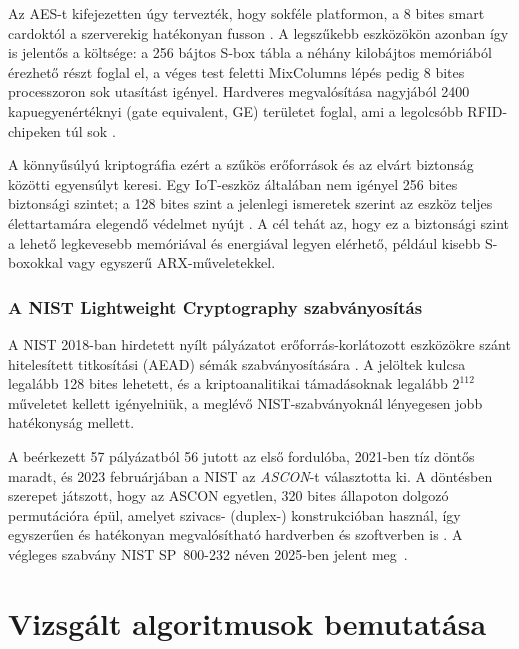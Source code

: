 \documentclass[a4paper,12pt]{report}
\theoremstyle{definition}
\theoremstyle{remark}
\begin{document}
Az AES-t kifejezetten úgy tervezték, hogy sokféle platformon, a 8 bites smart cardoktól a szerverekig hatékonyan fusson \cite{DaemenRijmen2002}. A legszűkebb eszközökön azonban így is jelentős a költsége: a 256 bájtos S-box tábla a néhány kilobájtos memóriából érezhető részt foglal el, a véges test feletti MixColumns lépés pedig 8 bites processzoron sok utasítást igényel. Hardveres megvalósítása nagyjából 2400 kapuegyenértéknyi (gate equivalent, GE) területet foglal, ami a legolcsóbb RFID-chipeken túl sok \cite{NISTIR8114}.

A könnyűsúlyú kriptográfia ezért a szűkös erőforrások és az elvárt biztonság közötti egyensúlyt keresi. Egy IoT-eszköz általában nem igényel 256 bites biztonsági szintet; a 128 bites szint a jelenlegi ismeretek szerint az eszköz teljes élettartamára elegendő védelmet nyújt \cite{Biryukov2017}. A cél tehát az, hogy ez a biztonsági szint a lehető legkevesebb memóriával és energiával legyen elérhető, például kisebb S-boxokkal vagy egyszerű ARX-műveletekkel.

\subsection{A NIST Lightweight Cryptography szabványosítás}

A NIST 2018-ban hirdetett nyílt pályázatot erőforrás-korlátozott eszközökre szánt hitelesített titkosítási (AEAD) sémák szabványosítására \cite{NISTLWC2023}. A jelöltek kulcsa legalább 128 bites lehetett, és a kriptoanalitikai támadásoknak legalább $2^{112}$ műveletet kellett igényelniük, a meglévő NIST-szabványoknál lényegesen jobb hatékonyság mellett.

A beérkezett 57 pályázatból 56 jutott az első fordulóba, 2021-ben tíz döntős maradt, és 2023 februárjában a NIST az \emph{ASCON}-t választotta ki. A döntésben szerepet játszott, hogy az ASCON egyetlen, 320 bites állapoton dolgozó permutációra épül, amelyet szivacs- (duplex-) konstrukcióban használ, így egyszerűen és hatékonyan megvalósítható hardverben és szoftverben is \cite{Dobraunig2021}. A végleges szabvány NIST SP~800-232 néven 2025-ben jelent meg~\cite{NISTSP800232}.

\chapter{Vizsgált algoritmusok bemutatása}\label{chap:algoritmusok}
\end{document}

